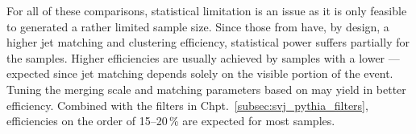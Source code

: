 For all of these comparisons, statistical limitation is an issue as it is only feasible to generated a rather limited sample size. Since those from \PYTHIA have, by design, a higher \gls{jet} matching and clustering efficiency, statistical power suffers partially for the \MADGRAPH samples. Higher efficiencies are usually achieved by samples with a lower \rinv---expected since \gls{jet} matching depends solely on the visible portion of the event. Tuning the merging scale and matching parameters based on \rinv may yield in better efficiency. Combined with the filters in Chpt.~\ref{subsec:svj_pythia_filters}, efficiencies on the order of 15--20\,\% are expected for most \MADGRAPH samples.


